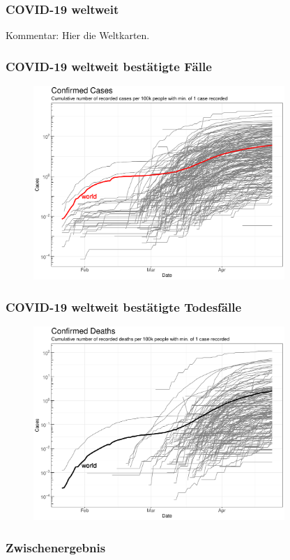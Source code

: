 \documentclass{beamer}
\begin{document}
 \begin{frame}
 	\frametitle{COVID-19 weltweit}
	Kommentar: Hier die Weltkarten.
 \end{frame}
 
 \begin{frame}
 	\frametitle{COVID-19 weltweit bestätigte Fälle}
	\begin{figure}
		\centering
		\includegraphics[width = 270pt]{Cases_cumulative_confirmed.pdf}
	\end{figure}
 \end{frame}

 \begin{frame}
 	\frametitle{COVID-19 weltweit bestätigte Todesfälle}
	\begin{figure}
		\centering
		\includegraphics[width = 270pt]{Cases_cumulative_deaths.pdf}
	\end{figure}
 \end{frame}

 \begin{frame}
 	\frametitle{Zwischenergebnis}
 \end{frame}
\end{document}
